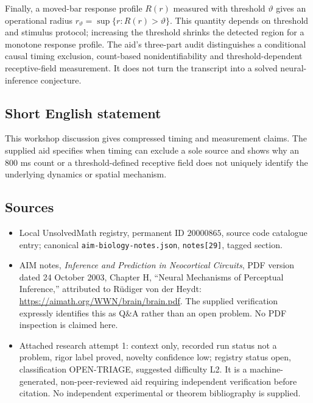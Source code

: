 \documentclass[11pt]{article}
\begin{document}
Finally, a moved-bar response profile $R(r)$ measured with threshold $\vartheta$ gives an operational radius $r_\vartheta=\sup\{r:R(r)>\vartheta\}$. This quantity depends on threshold and stimulus protocol; increasing the threshold shrinks the detected region for a monotone response profile. The aid's three-part audit distinguishes a conditional causal timing exclusion, count-based nonidentifiability and threshold-dependent receptive-field measurement. It does not turn the transcript into a solved neural-inference conjecture.
\subsection{Short English statement}
This workshop discussion gives compressed timing and measurement claims. The supplied aid specifies when timing can exclude a sole source and shows why an $800$ ms count or a threshold-defined receptive field does not uniquely identify the underlying dynamics or spatial mechanism.
\subsection{Sources}
\begin{itemize}
\item Local UnsolvedMath registry, permanent ID $20000865$, source code catalogue entry; canonical \texttt{aim-biology-notes.json}, \texttt{notes[29]}, tagged section.
\item AIM notes, \emph{Inference and Prediction in Neocortical Circuits}, PDF version dated 24 October 2003, Chapter H, ``Neural Mechanisms of Perceptual Inference,'' attributed to R\"udiger von der Heydt: \url{https://aimath.org/WWN/brain/brain.pdf}. The supplied verification expressly identifies this as Q\&A rather than an open problem. No PDF inspection is claimed here.
\item Attached research attempt 1: context only, recorded run status not a problem, rigor label proved, novelty confidence low; registry status open, classification OPEN-TRIAGE, suggested difficulty L2. It is a machine-generated, non-peer-reviewed aid requiring independent verification before citation. No independent experimental or theorem bibliography is supplied.
\end{itemize}
\end{document}
